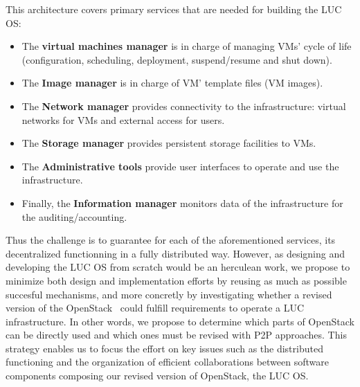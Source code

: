 This architecture covers primary services that are needed for building the LUC OS:
\begin{itemize}
\item The \textbf{virtual machines manager} is in charge of managing VMs' cycle of life (configuration, scheduling, deployment, suspend/resume and
  shut down).
\item The \textbf{Image manager} is in charge of VM' template files (\aka VM images).
\item The \textbf{Network manager} provides connectivity to the infrastructure: virtual networks for VMs and external access for users.
\item The \textbf{Storage manager} provides persistent storage facilities to VMs.
\item The \textbf{Administrative tools} provide user interfaces to operate and use the infrastructure.
\item Finally, the \textbf{Information manager} monitors data of the infrastructure for the auditing/accounting.
\end{itemize}

Thus the challenge is to guarantee for each of the aforementioned services, its decentralized functionning in a fully distributed way. However, as
designing and developing the LUC OS from scratch would be an herculean work, we propose to minimize both design and implementation efforts by reusing
as much as possible succesful mechanisms, and more concretly by investigating whether a revised version of the OpenStack~\cite{openstack} could
fulfill requirements to operate a LUC infrastructure. In other words, we propose to determine which parts of OpenStack can be directly used and which
ones must be revised with P2P approaches. This strategy enables us to focus the effort on key issues such as the distributed functioning and the
organization of efficient collaborations between software components composing our revised version of OpenStack, \aka the LUC OS.
